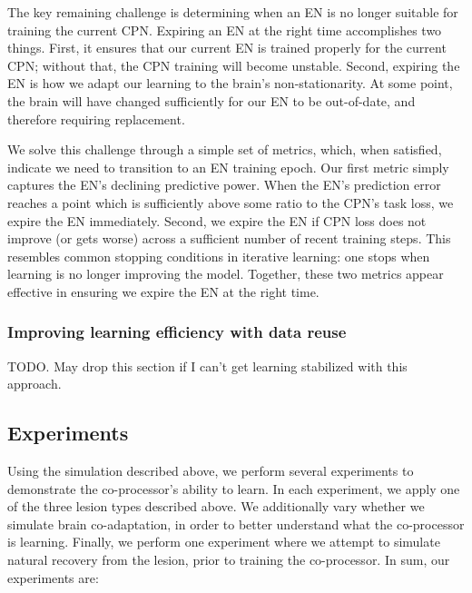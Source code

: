 \documentclass[12pt]{iopart}
\begin{document}
The key remaining challenge is determining when an EN is no longer suitable for training the
current CPN. Expiring an EN at the right time accomplishes two things. First, it ensures
that our current EN is trained properly for the current CPN; without that, the CPN training
will become unstable. Second, expiring the EN is how we adapt our learning to the brain's
non-stationarity. At some point, the brain will have changed sufficiently for our EN to be
out-of-date, and therefore requiring replacement.

We solve this challenge through a simple set of metrics, which, when satisfied, indicate
we need to transition to an EN training epoch. Our first metric simply captures the EN's
declining predictive power. When the EN's prediction error reaches a point which is
sufficiently above some ratio to the CPN's task loss, we expire the EN immediately.
Second, we expire the EN if CPN loss does not improve (or gets worse) across a sufficient
number of recent training steps. This resembles common stopping conditions in
iterative learning: one stops when learning is no longer improving the model. Together,
these two metrics appear effective in ensuring we expire the EN at the right time.

\subsubsection{Improving learning efficiency with data reuse}
TODO. May drop this section if I can't get learning stabilized with this approach.

\subsection{Experiments}
\label{sec:experiments}

Using the simulation described above, we perform several experiments to
demonstrate the co-processor's ability to learn. In each experiment, we apply one
of the three lesion types described above. We additionally vary whether we simulate
brain co-adaptation, in order to better understand what the co-processor is learning.
Finally, we perform one experiment where we attempt to simulate natural recovery from
the lesion, prior to training the co-processor. In sum, our experiments are:
\end{document}

